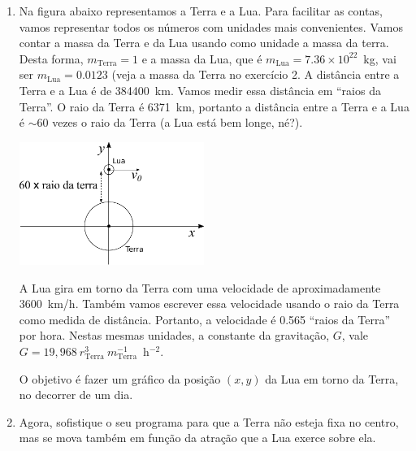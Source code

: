 \documentclass[10pt,a4paper,ssfamily]{exam}
\begin{document}
\begin{enumerate}
\item
Na figura abaixo representamos a Terra e a Lua. Para facilitar as
contas, vamos representar todos os números com unidades mais
convenientes. Vamos contar a massa da Terra e da Lua usando como unidade
a massa da terra. Desta forma, $m_{\textrm{Terra}} = 1$ e a massa da
Lua, que é $m_{\textrm{Lua}} = 7.36\times 10^{22}$~kg, vai ser 
$m_{\textrm{Lua}} = 0.0123$ (veja a massa da Terra no exercício 2.
A distância entre a Terra e a Lua é de 384400~km. Vamos medir essa
distância em ``raios da Terra''. O raio da Terra é 6371~km, portanto a
distância entre a Terra e a Lua é $\sim$60 vezes o raio da Terra (a Lua
está bem longe, né?). 
\begin{center}
\includegraphics[width=6cm]{./figuras/terra_e_lua.pdf}
\end{center}
A Lua gira em torno da Terra com uma velocidade de aproximadamente 3600~km/h. 
Também vamos escrever essa velocidade usando o raio da Terra
como medida de distância. Portanto, a velocidade é 0.565 ``raios da
Terra'' por hora. Nestas mesmas unidades, a constante da gravitação,
$G$, vale $G = 19,968~r_{\textrm{Terra}}^3~ m_{\textrm{Terra}}^{-1}$~h$^{-2}$.

O objetivo é fazer um gráfico da posição $(x,y)$ da Lua em torno da
Terra, no decorrer de um dia.

\item
Agora, sofistique o seu programa para que a Terra não esteja fixa no
centro, mas se mova também em função da atração que a Lua exerce sobre
ela.



\end{enumerate}
\end{document}
